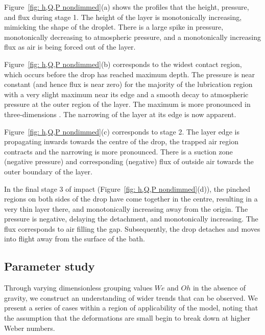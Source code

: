 Figure~\ref{fig: h,Q,P nondimmed}(a) shows the profiles that the height, pressure, and flux during stage 1. The height of the layer is monotonically increasing, mimicking the shape of the droplet. There is a large spike in pressure, monotonically decreasing to atmospheric pressure, and a monotonically increasing flux as air is being forced out of the layer.

Figure~\ref{fig: h,Q,P nondimmed}(b) corresponds to the widest contact region, which occurs before the drop has reached maximum depth. The pressure is near constant (and hence flux is near zero) for the majority of the lubrication region with a very slight maximum near its edge and a smooth decay to atmospheric pressure at the outer region of the layer. The maximum is more pronounced in three-dimensions \cite{phillips2024lubrication}. The narrowing of the layer at its edge is now apparent.

Figure~\ref{fig: h,Q,P nondimmed}(c) corresponds to stage 2. The layer edge is propagating inwards towards the centre of the drop, the trapped air region contracts and the narrowing is more pronounced. There is a suction zone (negative pressure) and corresponding (negative) flux of outside air towards the outer boundary of the layer.

In the final stage 3 of impact (Figure~\ref{fig: h,Q,P nondimmed}(d)), the pinched regions on both sides of the drop have come together in the centre, resulting in a very thin layer there, and monotonically increasing away from the origin. The pressure is negative, delaying the detachment, and monotonically increasing. The flux corresponds to air filling the gap. Subsequently, the drop detaches and moves into flight away from the surface of the bath. 


\subsection{Parameter study}

Through varying dimensionless grouping values $W\!e$ and $Oh$ in the absence of gravity, we construct an understanding of wider trends that can be observed. We present a series of cases within a region of applicability of the model, noting that the assumption that the deformations are small begin to break down at higher Weber numbers. 

